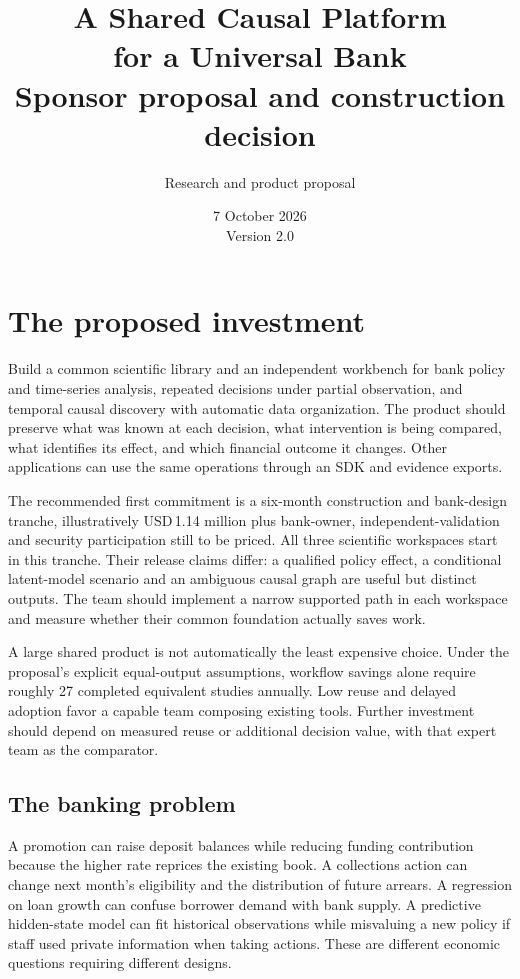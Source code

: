\documentclass[11pt,a4paper,openany]{book}
\title{\sffamily\bfseries\color{ink}\Huge A Shared Causal Platform\\for a Universal Bank\\[16pt]
\Large Sponsor proposal and construction decision}
\author{Research and product proposal}
\date{7 October 2026\\Version 2.0}
\begin{document}
\maketitle
\chapter*{The proposed investment}
Build a common scientific library and an independent workbench for bank
policy and time-series analysis, repeated decisions under partial observation,
and temporal causal discovery with automatic data organization. The product
should preserve what was known at each decision, what intervention is being
compared, what identifies its effect, and which financial outcome it changes.
Other applications can use the same operations through an SDK and evidence
exports.

The recommended first commitment is a six-month construction and bank-design
tranche, illustratively USD\,1.14 million plus bank-owner, independent-validation
and security participation still to be priced. All three scientific workspaces
start in this tranche. Their release claims differ: a qualified policy effect,
a conditional latent-model scenario and an ambiguous causal graph are useful
but distinct outputs. The team should implement a narrow supported path in
each workspace and measure whether their common foundation actually saves work.

A large shared product is not automatically the least expensive choice.
Under the proposal's explicit equal-output assumptions, workflow savings
alone require roughly 27 completed equivalent studies annually. Low reuse
and delayed adoption favor a capable team composing existing tools.
Further investment should depend on measured reuse or additional decision
value, with that expert team as the comparator.

\section*{The banking problem}
A promotion can raise deposit balances while reducing funding contribution
because the higher rate reprices the existing book. A collections action can
change next month's eligibility and the distribution of future arrears.
A regression on loan growth can confuse borrower demand with bank supply.
A predictive hidden-state model can fit historical observations while
misvaluing a new policy if staff used private information when taking actions.
These are different economic questions requiring different designs.
\end{document}
